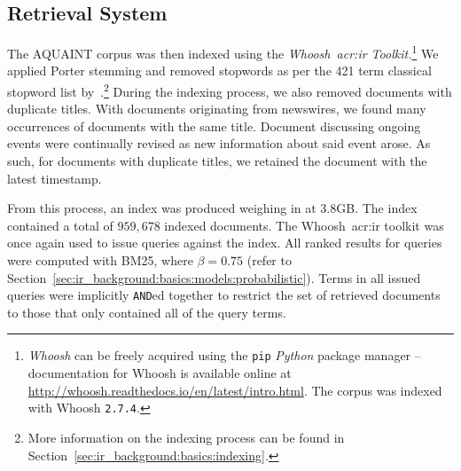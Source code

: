 \begin{figure}[h]
    \centering
    \vspace{6mm}
    \vspace{-9mm}
    \label{fig:aquaint_stats}
\end{figure}

\subsection{Retrieval System}\label{sec:methodology:collection:system}
The AQUAINT corpus was then indexed using the \emph{Whoosh~\gls{acr:ir} Toolkit.}\footnote{\emph{Whoosh} can be freely acquired using the \texttt{pip} \emph{Python} package manager -- documentation for Whoosh is available online at \url{http://whoosh.readthedocs.io/en/latest/intro.html}.  The corpus was indexed with Whoosh \texttt{2.7.4}.} We applied Porter stemming and removed stopwords as per the 421 term classical stopword list by~\cite{fox1992stopwords}.\footnote{More information on the indexing process can be found in Section~\ref{sec:ir_background:basics:indexing}.} During the indexing process, we also removed documents with duplicate titles. With documents originating from newswires, we found many occurrences of documents with the same title. Document discussing ongoing events were continually revised as new information about said event arose. As such, for documents with duplicate titles, we retained the document with the latest timestamp.

From this process, an index was produced weighing in at $3.8$GB. The index contained a total of $959,678$ indexed documents. The Whoosh~\gls{acr:ir} toolkit was once again used to issue queries against the index. All ranked results for queries were computed with BM25, where $\beta=0.75$ (refer to Section~\ref{sec:ir_background:basics:models:probabilistic}). Terms in all issued queries were implicitly \texttt{AND}ed together to restrict the set of retrieved documents to those that only contained all of the query terms.

